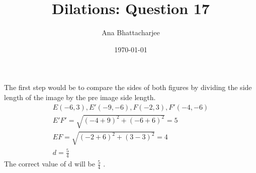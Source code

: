 \documentclass{article}
\begin{document}
\title{Dilations: Question 17}
\author{Ana Bhattacharjee}
\date{\today}
\maketitle{}
\begin{center}
The first step would be to compare the sides of both figures by dividing the side length of the image by the pre image side length.
\begin{align}
  E (-6, 3) , E' (-9, -6), F (-2, 3), F' (-4, -6) \\
  E'F' = \sqrt{(-4 + 9)^2 + (-6 + 6)^2} = 5 \\
  EF = \sqrt{(-2 + 6)^2 + (3 - 3)^2} = 4 \\
  d = \frac{5}{4}
\end{align}
The correct value of d will be $\frac{5}{4}$ .
\end{center}
\end{document}
